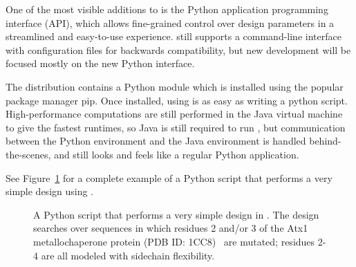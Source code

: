 
One of the most visible additions to  is the Python application programming interface (API), which allows fine-grained control over design parameters in a streamlined and easy-to-use experience.  still supports a command-line interface with configuration files for backwards compatibility, but new development will be focused mostly on the new Python interface. %

The  distribution contains a Python module which is installed using the popular package manager {\sc pip}. Once installed, using  is as easy as writing a python script. High-performance computations are still performed in the Java virtual machine to give the fastest runtimes, so Java is still required to run , but communication between the Python environment and the Java environment is handled behind-the-scenes, and  still looks and feels like a regular Python application.

See Figure~\ref{fig:python} for a complete example of a Python script that performs a very simple design using .

\begin{figure}
{
	
}
\caption{A Python script that performs a very simple design in .  The design searches over sequences in which residues 2 and/or 3 of the Atx1 metallochaperone protein (PDB ID: 1CC8)~\cite{1CC8} are mutated; residues 2-4 are all modeled with sidechain flexibility.  }
\label{fig:python}
\end{figure}
